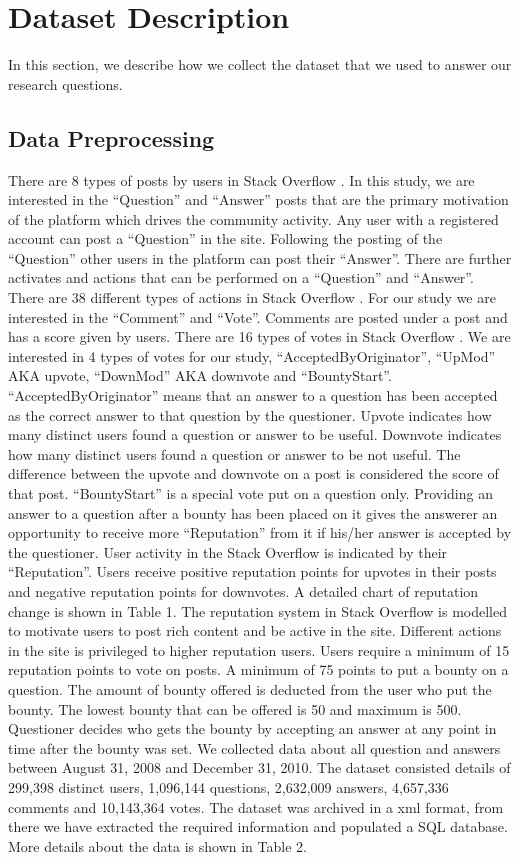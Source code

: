 \section{Dataset Description}
In this section, we describe how we collect the dataset that we used to answer our research questions.

\subsection{Data Preprocessing}
There are 8 types of posts by users in Stack Overflow \cite{b1}. In this study, we are interested in the “Question” and “Answer” posts that are the primary motivation of the platform which drives the community activity. Any user with a registered account can post a “Question” in the site. Following the posting of the “Question” other users in the platform can post their “Answer”. There are further activates and actions that can be performed on a “Question” and “Answer”. 
There are 38 different types of actions in Stack Overflow \cite{b1}. For our study we are interested in the “Comment” and “Vote”. Comments are posted under a post and has a score given by users. There are 16 types of votes in Stack Overflow \cite{b1}. We are interested in 4 types of votes for our study, “AcceptedByOriginator”, “UpMod” AKA upvote, “DownMod” AKA downvote and “BountyStart”.  “AcceptedByOriginator” means that an answer to a question has been accepted as the correct answer to that question by the questioner. Upvote indicates how many distinct users found a question or answer to be useful. Downvote indicates how many distinct users found a question or answer to be not useful. The difference between the upvote and downvote on a post is considered the score of that post. “BountyStart” is a special vote put on a question only. Providing an answer to a question after a bounty has been placed on it gives the answerer an opportunity to receive more “Reputation” from it if his/her answer is accepted by the questioner.
User activity in the Stack Overflow is indicated by their “Reputation”. Users receive positive reputation points for upvotes in their posts and negative reputation points for downvotes. A detailed chart of reputation change is shown in Table 1. The reputation system in Stack Overflow is modelled to motivate users to post rich content and be active in the site. Different actions in the site is privileged to higher reputation users. Users require a minimum of 15 reputation points to vote on posts. A minimum of 75 points to put a bounty on a question. The amount of bounty offered is deducted from the user who put the bounty. The lowest bounty that can be offered is 50 and maximum is 500. Questioner decides who gets the bounty by accepting an answer at any point in time after the bounty was set.
We collected data about all question and answers between August 31, 2008 and December 31, 2010. The dataset consisted details of 299,398 distinct users, 1,096,144 questions, 2,632,009 answers, 4,657,336 comments and 10,143,364 votes. The dataset was archived in a xml format, from there we have extracted the required information and populated a SQL database. More details about the data is shown in Table 2.
